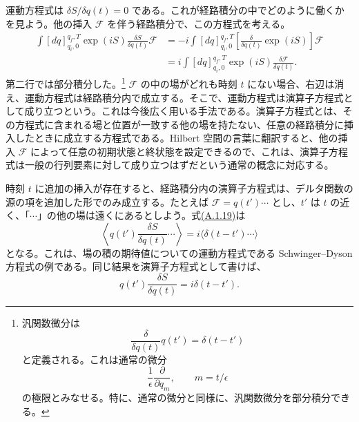 運動方程式は $\delta S/\delta q(t)=0$ である。これが経路積分の中でどのように働くかを見よう。他の挿入 $\mathcal F$ を伴う経路積分で、この方程式を考える。
\begin{equation}
\begin{aligned}
\int[dq]_{q_i,0}^{q_f,T}\exp(iS)\frac{\delta S}{\delta q(t)}\mathcal F
&=-i\int[dq]_{q_i,0}^{q_f,T}
\left[\frac{\delta}{\delta q(t)}\exp(iS)\right]\mathcal F\\
&=i\int[dq]_{q_i,0}^{q_f,T}\exp(iS)
\frac{\delta\mathcal F}{\delta q(t)}.
\end{aligned}
\tag{A.1.19}\label{eq:A.1.19}
\end{equation}
第二行では部分積分した。\footnote[2]{汎関数微分は
\[
\frac{\delta}{\delta q(t)}q(t')=\delta(t-t')
\]
と定義される。これは通常の微分
\[
\frac1\epsilon\frac{\partial}{\partial q_m},
\qquad m=t/\epsilon
\]
の極限とみなせる。特に、通常の微分と同様に、汎関数微分を部分積分できる。}
$\mathcal F$ の中の場がどれも時刻 $t$ にない場合、右辺は消え、運動方程式は経路積分内で成立する。そこで、運動方程式は演算子方程式として成り立つという。これは今後広く用いる手法である。演算子方程式とは、その方程式に含まれる場と位置が一致する他の場を持たない、任意の経路積分に挿入したときに成立する方程式である。Hilbert 空間の言葉に翻訳すると、他の挿入 $\mathcal F$ によって任意の初期状態と終状態を設定できるので、これは、演算子方程式は一般の行列要素に対して成り立つはずだという通常の概念に対応する。

時刻 $t$ に追加の挿入が存在すると、経路積分内の演算子方程式は、デルタ関数の源の項を追加した形でのみ成立する。たとえば $\mathcal F=q(t')\cdots$ とし、$t'$ は $t$ の近く、「$\cdots$」の他の場は遠くにあるとしよう。式\hyperref[eq:A.1.19]{(A.1.19)}は
\begin{equation}
\left\langle q(t')\frac{\delta S}{\delta q(t)}\cdots\right\rangle
=i\langle\delta(t-t')\cdots\rangle
\tag{A.1.20}\label{eq:A.1.20}
\end{equation}
となる。これは、場の積の期待値についての運動方程式である Schwinger--Dyson 方程式の例である。同じ結果を演算子方程式として書けば、
\begin{equation}
q(t')\frac{\delta S}{\delta q(t)}=i\delta(t-t').
\tag{A.1.21}\label{eq:A.1.21}
\end{equation}

